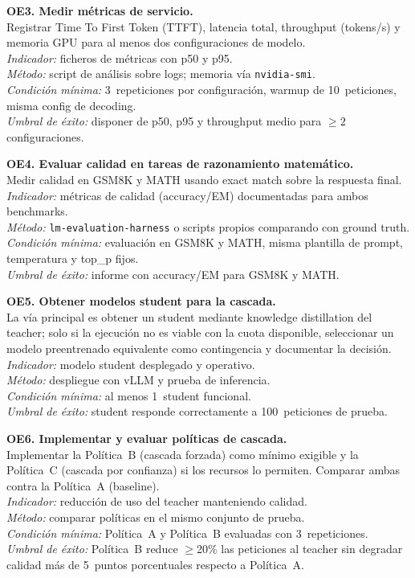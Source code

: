 \textbf{OE3. Medir métricas de servicio.}\\
Registrar Time To First Token (TTFT), latencia total, throughput (tokens/s) y memoria GPU para al menos dos configuraciones de modelo.\\
\textit{Indicador:} ficheros de métricas con p50 y p95.\\
\textit{Método:} script de análisis sobre logs; memoria vía \texttt{nvidia-smi}.\\
\textit{Condición mínima:} 3~repeticiones por configuración, warmup de 10~peticiones, misma config de decoding.\\
\textit{Umbral de éxito:} disponer de p50, p95 y throughput medio para $\geq2$ configuraciones.

\textbf{OE4. Evaluar calidad en tareas de razonamiento matemático.}\\
Medir calidad en GSM8K y MATH usando exact match sobre la respuesta final.\\
\textit{Indicador:} métricas de calidad (accuracy/EM) documentadas para ambos benchmarks.\\
\textit{Método:} \texttt{lm-evaluation-harness} o scripts propios comparando con ground truth.\\
\textit{Condición mínima:} evaluación en GSM8K y MATH, misma plantilla de prompt, temperatura y top\_p fijos.\\
\textit{Umbral de éxito:} informe con accuracy/EM para GSM8K y MATH.

\textbf{OE5. Obtener modelos student para la cascada.}\\
La vía principal es obtener un student mediante knowledge distillation del teacher; solo si la ejecución no es viable con la cuota disponible, seleccionar un modelo preentrenado equivalente como contingencia y documentar la decisión.\\
\textit{Indicador:} modelo student desplegado y operativo.\\
\textit{Método:} despliegue con vLLM y prueba de inferencia.\\
\textit{Condición mínima:} al menos 1~student funcional.\\
\textit{Umbral de éxito:} student responde correctamente a 100~peticiones de prueba.

\textbf{OE6. Implementar y evaluar políticas de cascada.}\\
Implementar la Política~B (cascada forzada) como mínimo exigible y la Política~C (cascada por confianza) si los recursos lo permiten. Comparar ambas contra la Política~A (baseline).\\
\textit{Indicador:} reducción de uso del teacher manteniendo calidad.\\
\textit{Método:} comparar políticas en el mismo conjunto de prueba.\\
\textit{Condición mínima:} Política~A y Política~B evaluadas con 3~repeticiones.\\
\textit{Umbral de éxito:} Política~B reduce $\geq$20\% las peticiones al teacher sin degradar calidad más de 5~puntos porcentuales respecto a Política~A.

